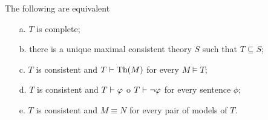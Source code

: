 \documentclass[creche.tex]{subfiles}
\begin{document}
\begin{proposition}\label{fattoconsistenzasensolato}
The following are equivalent
\begin{itemize}
\item[a.] $T$ is complete;
\item[b.] there is a unique maximal consistent theory $S$ such that $T\subseteq S$;
\item[c.] $T$ is consistent and $T\vdash\textrm{Th}(M)$ for every $M\models T$;
\item[d.] $T$ is consistent and $T\vdash\varphi$ o $T\vdash\neg\varphi$ for every sentence $\phi$;
\item[e.] $T$ is consistent and $M\equiv N$ for every pair of models of $T$.\QED
\end{itemize}
\end{proposition}
\end{document}
